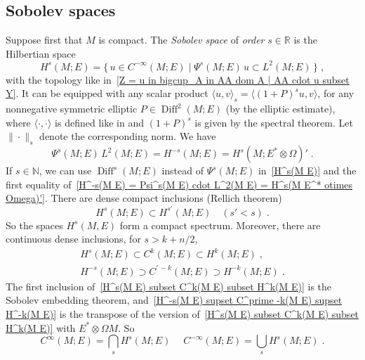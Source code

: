 \documentclass{memo-l}
\theoremstyle{plain}
\theoremstyle{definition}
\theoremstyle{remark}
\newcommand{\N}{\mathbb{N}}
\newcommand{\R}{\mathbb{R}}
\newcommand{\Diff}{\operatorname{Diff}}
\numberwithin{section}{chapter}
\numberwithin{equation}{section}%
\begin{document}
\subsection{Sobolev spaces}\label{ss: Sobolev sps}

Suppose first that $M$ is compact. The \emph{Sobolev space} of \emph{order} $s\in\R$ is the Hilbertian space 
\begin{equation}\label{H^s(M E)}
H^s(M;E)=\{\,u\in C^{-\infty}(M;E)\mid\Psi^s(M;E)\,u\subset L^2(M;E)\,\}\;,
\end{equation}
with the topology like in~\eqref{Z = u in bigcup_A in AA dom A | AA cdot u subset Y}. It can be equipped with any scalar product $\langle u,v\rangle_s=\langle(1+P)^su,v\rangle$, for any nonnegative symmetric elliptic $P\in\Diff^2(M;E)$ (by the elliptic estimate), where $\langle{\cdot},{\cdot}\rangle$ is defined like in  and $(1+P)^s$ is given by the spectral theorem. Let $\|{\cdot}\|_s$ denote the corresponding norm. We have
\begin{equation}\label{H^-s(M E) = Psi^s(M E) cdot L^2(M E) = H^s(M E^* otimes Omega)'}
\Psi^s(M;E)\,L^2(M;E)=H^{-s}(M;E)=H^s(M;E^*\otimes\Omega)'\;.
\end{equation}
If $s\in\N$, we can use $\Diff^s(M;E)$ instead of $\Psi^s(M;E)$ in~\eqref{H^s(M E)} and the first equality of~\eqref{H^-s(M E) = Psi^s(M E) cdot L^2(M E) = H^s(M E^* otimes Omega)'}. There are dense compact inclusions (Rellich theorem) \begin{equation}\label{H^s(M E) subset H^s'(M E)}
H^s(M;E)\subset H^{s'}(M;E)\quad(s'<s)\;.
\end{equation}
So the spaces $H^s(M,E)$ form a compact spectrum. Moreover, there are continuous dense inclusions, for $s>k+n/2$,
\begin{gather}
H^s(M;E)\subset C^k(M;E)\subset H^k(M;E)\;,\label{H^s(M E) subset C^k(M E) subset H^k(M E)}\\
H^{-s}(M;E)\supset C^{\prime\,-k}(M;E)\supset H^{-k}(M;E)\;.\label{H^-s(M E) supset C^prime -k(M E) supset H^-k(M E)}
\end{gather}
The first inclusion of~\eqref{H^s(M E) subset C^k(M E) subset H^k(M E)} is the Sobolev embedding theorem, and~\eqref{H^-s(M E) supset C^prime -k(M E) supset H^-k(M E)} is the transpose of the version of~\eqref{H^s(M E) subset C^k(M E) subset H^k(M E)} with $E^*\otimes\Omega M$. So
\begin{equation}\label{C^infty(M E) = bigcap_s H^s(M E)}
C^\infty(M;E)=\bigcap_sH^s(M;E)\;\quad 
C^{-\infty}(M;E)=\bigcup_sH^s(M;E)\;.
\end{equation}
\end{document}
